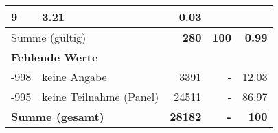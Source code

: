 \begin{longtable}{lXrrr}
       \num{9} &
       \num[round-mode=places,round-precision=2]{3.21} &
         \num[round-mode=places,round-precision=2]{0.03} \\
     \midrule
     \multicolumn{2}{l}{Summe (gültig)} &
       \textbf{\num{280}} &
     \textbf{100} &
       \textbf{\num[round-mode=places,round-precision=2]{0.99}} \\
     \multicolumn{5}{l}{\textbf{Fehlende Werte}}\\
       -998 &
       keine Angabe &
         \num{3391} &
        - &
         \num[round-mode=places,round-precision=2]{12.03} \\
       -995 &
       keine Teilnahme (Panel) &
         \num{24511} &
        - &
         \num[round-mode=places,round-precision=2]{86.97} \\
     \midrule
     \multicolumn{2}{l}{\textbf{Summe (gesamt)}} &
          \textbf{\num{28182}} &
        \textbf{-} &
        \textbf{100} \\
     \bottomrule
     \end{longtable}
     
